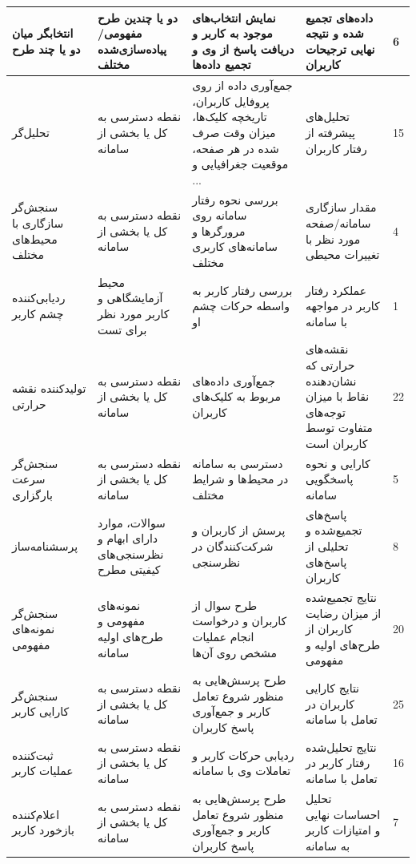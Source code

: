 \begin{longtable}[c]{|C{3cm}|C{3.2cm}|C{3.2cm}|C{3.2cm}|C{0.8cm}|}
		\hline
		\endlastfoot
		انتخابگر میان دو یا چند طرح & دو یا چندین طرح مفهومی/پیاده‌سازی‌شده مختلف & نمایش انتخاب‌های موجود به کاربر و دریافت پاسخ از وی و تجمیع داده‌ها & داده‌های تجمیع شده و نتیجه نهایی ترجیحات کاربران & 6 \\ \hline
		تحلیل‌گر & نقطه دسترسی به کل یا بخشی از سامانه & جمع‌آوری داده از روی پروفایل کاربران، تاریخچه کلیک‌ها، میزان وقت صرف شده در هر صفحه، موقعیت جغرافیایی و ... & تحلیل‌های پیشرفته از رفتار کاربران & 15 \\ \hline
		سنجش‌گر سازگاری با محیط‌های مختلف & نقطه دسترسی به کل یا بخشی از سامانه & بررسی نحوه رفتار سامانه  روی مرورگرها و سامانه‌های کاربری مختلف & مقدار سازگاری سامانه/صفحه مورد نظر با تغییرات محیطی & 4 \\ \hline
		ردیابی‌کننده  چشم کاربر & محیط آزمایشگاهی و کاربر مورد نظر برای تست & بررسی رفتار کاربر به واسطه حرکات چشم او & عملکرد رفتار کاربر در مواجهه با سامانه & 1 \\ \hline
		تولیدکننده نقشه حرارتی & نقطه دسترسی به کل یا بخشی از سامانه & جمع‌‌آوری داده‌های مربوط به کلیک‌های کاربران & نقشه‌های حرارتی که نشان‌دهنده نقاط با میزان توجه‌های متفاوت توسط کاربران است & 22 \\ \hline
		سنجش‌‌گر سرعت بارگزاری & نقطه دسترسی به کل یا بخشی از سامانه & دسترسی به سامانه در محیط‌ها و شرایط مختلف & کارایی و نحوه پاسخگویی سامانه & 5 \\ \hline
		پرسشنامه‌ساز & سوالات، موارد دارای ابهام و نظرسنجی‌های کیفیتی مطرح & پرسش از کاربران و شرکت‌کنندگان در نظرسنجی & پاسخ‌های تجمیع‌شده و تحلیلی از پاسخ‌های کاربران & 8 \\ \hline
		سنجش‌گر نمونه‌های مفهومی & نمونه‌های مفهومی و طرح‌های اولیه سامانه & طرح سوال از کاربران و درخواست انجام عملیات مشخص روی آن‌ها & نتایج تجمیع‌شده از میزان رضایت کاربران از طرح‌های اولیه و مفهومی & 20 \\ \hline
		سنجش‌گر کارایی کاربر & نقطه دسترسی به کل یا بخشی از سامانه & طرح پرسش‌هایی به منظور شروع تعامل کاربر و جمع‌آوری پاسخ کاربران & نتایج کارایی کاربران در تعامل با سامانه & 25 \\ \hline
		ثبت‌کننده عملیات کاربر & نقطه دسترسی به کل یا بخشی از سامانه & ردیابی حرکات کاربر و تعاملات وی با سامانه & نتایج تحلیل‌شده رفتار کاربر در تعامل با سامانه & 16 \\ \hline
		اعلام‌کننده بازخورد کاربر & نقطه دسترسی به کل یا بخشی از سامانه & طرح پرسش‌هایی به منظور شروع تعامل کاربر و جمع‌آوری پاسخ کاربران & تحلیل احساسات نهایی و امتیازات کاربر به سامانه & 7 \\ \hline
\end{longtable}
